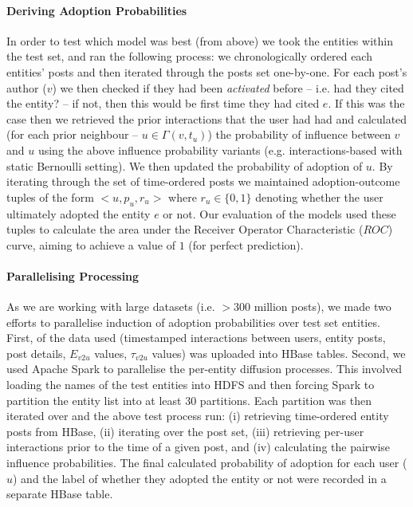 \documentclass[sigconf]{acmart}
\begin{document}
\paragraph{Deriving Adoption Probabilities}
In order to test which model was best (from above) we took the entities within the test set, and ran the following process: we chronologically ordered each entities' posts and then iterated through the posts set one-by-one.
For each post's author ($v$) we then checked if they had been \emph{activated} before -- i.e. had they cited the entity? -- if not, then this would be first time they had cited $e$.
If this was the case then we retrieved the prior interactions that the user had had and calculated (for each prior neighbour -- $u \in \Gamma(v, t_u)$) the probability of influence between $v$ and $u$ using the above influence probability variants (e.g. interactions-based with static Bernoulli setting).
We then updated the probability of adoption of $u$.
By iterating through the set of time-ordered posts we maintained adoption-outcome tuples of the form $<u, p_u, r_u>$ where $r_u \in \{0,1\}$ denoting whether the user ultimately adopted the entity $e$ or not.
Our evaluation of the models used these tuples to calculate the area under the Receiver Operator Characteristic ($ROC$) curve, aiming to achieve a value of $1$ (for perfect prediction).

\paragraph{Parallelising Processing}
As we are working with large datasets (i.e. $>300$ million posts), we made two efforts to parallelise induction of adoption probabilities over test set entities.
First, of the data used (timestamped interactions between users, entity posts, post details, $E_{v2u}$ values, $\tau_{v2u}$ values) was uploaded into HBase tables. %
Second, we used Apache Spark%
 to parallelise the per-entity diffusion processes.
This involved loading the names of the test entities into HDFS and then forcing Spark to partition the entity list into at least 30 partitions.
Each partition was then iterated over and the above test process run: (i) retrieving time-ordered entity posts from HBase, (ii) iterating over the post set, (iii) retrieving per-user interactions prior to the time of a given post, and (iv) calculating the pairwise influence probabilities.
The final calculated probability of adoption for each user ($u$) and the label of whether they adopted the entity or not were recorded in a separate HBase table.
\end{document}
